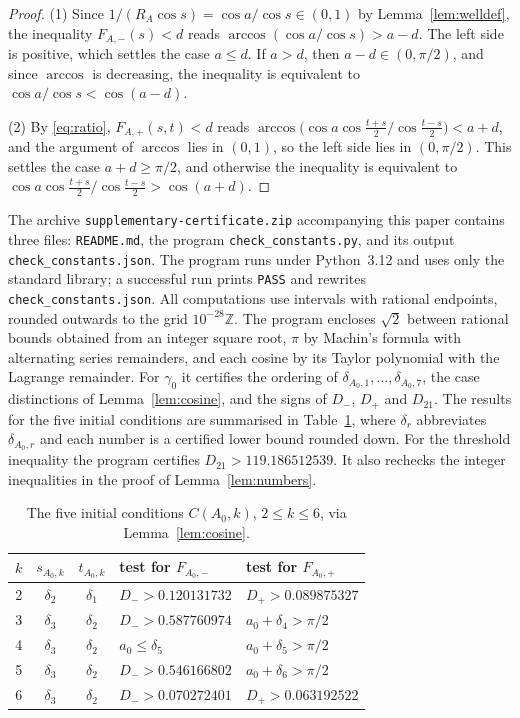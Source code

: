 \documentclass{amsart}
\theoremstyle{definition}
\theoremstyle{remark}
\numberwithin{equation}{section}
\newcommand{\Z}{\mathbb{Z}}
\begin{document}
\begin{proof}
(1) Since $1/(R_A\cos s)=\cos a/\cos s\in(0,1)$ by Lemma~\ref{lem:welldef}, the inequality $F_{A,-}(s)<d$ reads $\arccos(\cos a/\cos s)>a-d$. The left side is positive, which settles the case $a\le d$. If $a>d$, then $a-d\in(0,\pi/2)$, and since $\arccos$ is decreasing, the inequality is equivalent to $\cos a/\cos s<\cos(a-d)$.

(2) By \eqref{eq:ratio}, $F_{A,+}(s,t)<d$ reads $\arccos\bigl(\cos a\cos\frac{t+s}2/\cos\frac{t-s}2\bigr)<a+d$, and the argument of $\arccos$ lies in $(0,1)$, so the left side lies in $(0,\pi/2)$. This settles the case $a+d\ge\pi/2$, and otherwise the inequality is equivalent to $\cos a\cos\frac{t+s}2/\cos\frac{t-s}2>\cos(a+d)$.
\end{proof}

The archive \texttt{supplementary-certificate.zip} accompanying this paper contains three files: \texttt{README.md}, the program \texttt{check\_constants.py}, and its output \texttt{check\_constants.json}. The program runs under Python~3.12 and uses only the standard library; a successful run prints \texttt{PASS} and rewrites \texttt{check\_constants.json}. All computations use intervals with rational endpoints, rounded outwards to the grid $10^{-28}\Z$. The program encloses $\sqrt2$ between rational bounds obtained from an integer square root, $\pi$ by Machin's formula with alternating series remainders, and each cosine by its Taylor polynomial with the Lagrange remainder. For $\gamma_0$ it certifies the ordering of $\delta_{A_0,1},\dots,\delta_{A_0,7}$, the case distinctions of Lemma~\ref{lem:cosine}, and the signs of $D_-$, $D_+$ and $D_{21}$. The results for the five initial conditions are summarised in Table~\ref{tab:seed}, where $\delta_r$ abbreviates $\delta_{A_0,r}$ and each number is a certified lower bound rounded down. For the threshold inequality the program certifies $D_{21}>119.186512539$. It also rechecks the integer inequalities in the proof of Lemma~\ref{lem:numbers}.

\begin{table}[ht]
\caption{The five initial conditions $C(A_0,k)$, $2\le k\le6$, via Lemma~\ref{lem:cosine}.}\label{tab:seed}
\begin{tabular}{cccll}
\toprule
$k$ & $s_{A_0,k}$ & $t_{A_0,k}$ & test for $F_{A_0,-}$ & test for $F_{A_0,+}$\\
\midrule
2 & $\delta_2$ & $\delta_1$ & $D_->0.120131732$ & $D_+>0.089875327$\\
3 & $\delta_3$ & $\delta_2$ & $D_->0.587760974$ & $a_0+\delta_4>\pi/2$\\
4 & $\delta_3$ & $\delta_2$ & $a_0\le\delta_5$ & $a_0+\delta_5>\pi/2$\\
5 & $\delta_3$ & $\delta_2$ & $D_->0.546166802$ & $a_0+\delta_6>\pi/2$\\
6 & $\delta_3$ & $\delta_2$ & $D_->0.070272401$ & $D_+>0.063192522$\\
\bottomrule
\end{tabular}
\end{table}
\end{document}
